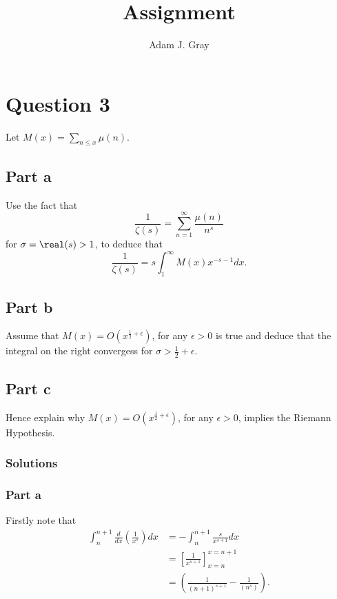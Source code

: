 \documentclass{unswmaths}
\begin{document}
\author{Adam J. Gray}
\subject{Number Theory}
\title{Assignment}

\unswtitle

\section*{Question 3}

Let $ M(x) = \sum_{n \leq x} \mu(n) $.

\subsection*{Part a}

Use the fact that 
$$
	\frac{1}{\zeta(s)} = \sum_{n =1}^\infty \frac{\mu(n)}{n^s}
$$
for $ \sigma = \real(s) > 1 $, to deduce that 
$$
	\frac{1}{\zeta(s)} = s \int_1^\infty M(x)x^{-s-1} dx.
$$

\subsection*{Part b}
Assume that $ M(x) = O(x^{\frac{1}{2} + \epsilon}) $, for any $ \epsilon > 0 $ is true and deduce 
that the integral on the right convergess for $ \sigma > \frac{1}{2} + \epsilon $.

\subsection*{Part c}

Hence explain why $ M(x) = O(x^{\frac{1}{2} + \epsilon}) $, for any $ \epsilon > 0 $, implies the Riemann Hypothesis.

\subsubsection*{Solutions}

\subsubsection*{Part a}

Firstly note that
\begin{align*}
	\int_{n}^{n+1} \frac{d}{dx}\left( \frac{1}{x^s} \right) dx &= -\int_{n}^{n+1}\frac{s}{x^{s+1}}dx \\
		&= \left[ \frac{1}{x^{s+1}} \right]_{x = n}^{x=n+1} \\
		&= \left( \frac{1}{(n+1)^{s+1}} - \frac{1}{(n^s)} \right).
\end{align*}
\end{document}
